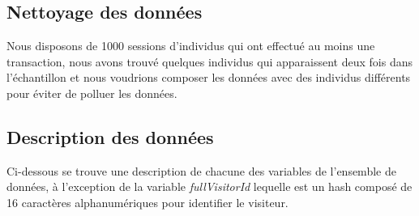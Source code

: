 
\subsection{Nettoyage des données}
Nous disposons de 1000 sessions d'individus qui ont effectué au moins une transaction, nous avons trouvé quelques individus qui apparaissent deux fois dans l'échantillon et nous voudrions composer les données avec des individus différents pour éviter de polluer  les données.

\subsection{Description des données}
Ci-dessous se trouve une description de chacune des variables de l'ensemble de données, à l'exception de la variable \textit{fullVisitorId} lequelle est un hash composé de 16 caractères alphanumériques pour identifier le visiteur.



